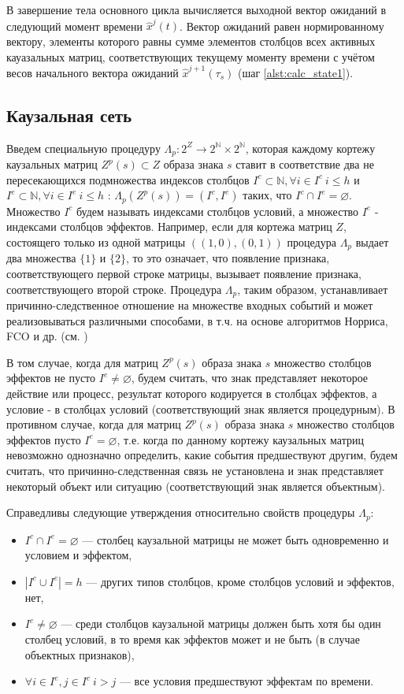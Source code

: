 \documentclass[12pt]{scrartcl}
\begin{document}
	В завершение тела основного цикла вычисляется выходной вектор ожиданий в следующий момент времени $\hat x^j(t)$. Вектор ожиданий равен нормированному вектору, элементы которого равны сумме элементов столбцов всех активных кауазальных матриц, соответствующих текущему моменту времени с учётом весов начального вектора ожиданий $\hat x^{j+1}(\tau_s)$ (шаг \ref{alst:calc_state1}).

	\subsection{Каузальная сеть}
	
	Введем специальную процедуру $\Lambda_p: 2^Z\rightarrow 2^{\mathbb N}\times 2^{\mathbb N}$, которая каждому кортежу каузальных матриц $Z^p(s)\subset Z$ образа знака $s$ ставит в соответствие два не пересекающихся подмножества индексов столбцов $I^c\subset\mathbb N, \forall i\in I^c\ i\leq h$ и $I^e\subset\mathbb N, \forall i\in I^e\ i\leq h$ : $\Lambda_p(Z^p(s))=(I^c,I^e)$ таких, что $I^c\cap I^e=\varnothing$. Множество $I^c$ будем называть индексами столбцов условий, а множество $I^e$ - индексами столбцов эффектов. Например, если для кортежа матриц $Z$, состоящего только из одной матрицы $((1, 0), (0, 1))$ процедура $\Lambda_p$ выдает два множества $\{1\}$ и $\{2\}$, то это означает, что появление признака, соответствующего первой строке матрицы, вызывает появление признака, соответствующего второй строке. Процедура $\Lambda_p$, таким образом, устанавливает причинно-следственное отношение на множестве входных событий и может реализовываться различными способами, в т.ч. на основе алгоритмов Норриса, FCO и др. (см. \cite{Kuznetsov2001,Kuznetsov1996})

	В том случае, когда для матриц $Z^p(s)$ образа знака $s$ множество столбцов эффектов не пусто $I^e \not=\varnothing$, будем считать, что знак представляет некоторое действие или процесс, результат которого кодируется в столбцах эффектов, а условие - в столбцах условий (соответствующий знак является процедурным). В противном случае, когда для матриц $Z^p(s)$ образа знака $s$ множество столбцов эффектов пусто $I^e=\varnothing$, т.е. когда по данному кортежу каузальных матриц невозможно однозначно определить, какие события предшествуют другим, будем считать, что причинно-следственная связь не установлена и знак представляет некоторый объект или ситуацию (соответствующий знак является объектным). 

	
	Справедливы следующие утверждения относительно свойств процедуры $\Lambda_p$:
	\begin{itemize}
		\item $I^c\cap I^e=\varnothing$ --- столбец каузальной матрицы не может быть одновременно и условием и эффектом,
		\item $|I^c\cup I^e|=h$ --- других типов столбцов, кроме столбцов условий и эффектов, нет,
		\item $I^c\not = \varnothing$ --- среди столбцов каузальной матрицы должен быть хотя бы один столбец условий, в то время как эффектов может и не быть (в случае объектных признаков),
		\item $\forall i\in I^e, j\in I^c\ i>j$ --- все условия предшествуют эффектам по времени.
	\end{itemize}
	
\end{document}
